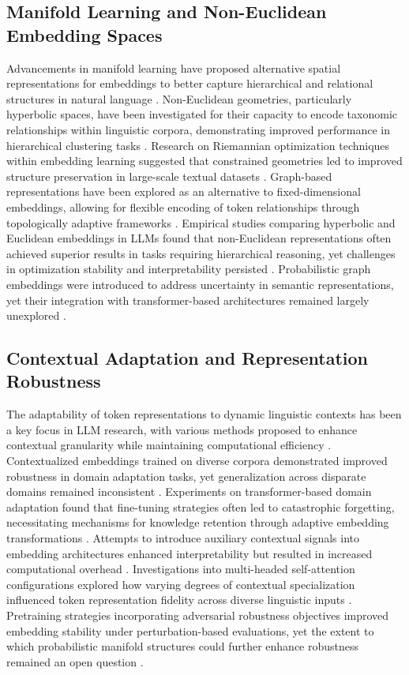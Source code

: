 \documentclass{article}
\begin{document}
\subsection{Manifold Learning and Non-Euclidean Embedding Spaces}
Advancements in manifold learning have proposed alternative spatial representations for embeddings to better capture hierarchical and relational structures in natural language \cite{foster2024token}. Non-Euclidean geometries, particularly hyperbolic spaces, have been investigated for their capacity to encode taxonomic relationships within linguistic corpora, demonstrating improved performance in hierarchical clustering tasks \cite{ kwiatkowska2024reducing}. Research on Riemannian optimization techniques within embedding learning suggested that constrained geometries led to improved structure preservation in large-scale textual datasets \cite{roux2024dynamic}. Graph-based representations have been explored as an alternative to fixed-dimensional embeddings, allowing for flexible encoding of token relationships through topologically adaptive frameworks \cite{atox2024evaluating}. Empirical studies comparing hyperbolic and Euclidean embeddings in LLMs found that non-Euclidean representations often achieved superior results in tasks requiring hierarchical reasoning, yet challenges in optimization stability and interpretability persisted \cite{chadwick2024assessments}. Probabilistic graph embeddings were introduced to address uncertainty in semantic representations, yet their integration with transformer-based architectures remained largely unexplored \cite{inodor2024context}. 

\subsection{Contextual Adaptation and Representation Robustness}
The adaptability of token representations to dynamic linguistic contexts has been a key focus in LLM research, with various methods proposed to enhance contextual granularity while maintaining computational efficiency \cite{huso2023binary}. Contextualized embeddings trained on diverse corpora demonstrated improved robustness in domain adaptation tasks, yet generalization across disparate domains remained inconsistent \cite{ hollart2024functional}. Experiments on transformer-based domain adaptation found that fine-tuning strategies often led to catastrophic forgetting, necessitating mechanisms for knowledge retention through adaptive embedding transformations \cite{eamen2024neural}. Attempts to introduce auxiliary contextual signals into embedding architectures enhanced interpretability but resulted in increased computational overhead \cite{tate2024dynamic}. Investigations into multi-headed self-attention configurations explored how varying degrees of contextual specialization influenced token representation fidelity across diverse linguistic inputs \cite{huang2024measuring}. Pretraining strategies incorporating adversarial robustness objectives improved embedding stability under perturbation-based evaluations, yet the extent to which probabilistic manifold structures could further enhance robustness remained an open question \cite{zhang2024evaluating}.
\end{document}

